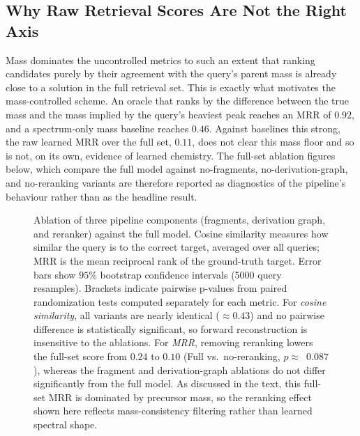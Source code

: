 \subsection{Why Raw Retrieval Scores Are Not the Right Axis}
\label{sec:raw-scores}

Mass dominates the uncontrolled metrics to such an extent that ranking candidates purely by their agreement with the query's parent mass is already close to a solution in the full retrieval set.
This is exactly what motivates the mass-controlled scheme.
An oracle that ranks by the difference between the true mass and the mass implied by the query's heaviest peak reaches an MRR of $0.92$, and a spectrum-only mass baseline reaches $0.46$.
Against baselines this strong, the raw learned MRR over the full set, $0.11$, does not clear this mass floor and so is not, on its own, evidence of learned chemistry.
The full-set ablation figures below, which compare the full model against no-fragments, no-derivation-graph, and no-reranking variants are therefore reported as diagnostics of the pipeline's behaviour rather than as the headline result.

\begin{figure}[H]
    \centering
    \caption[Cosine similarity and MRR for ablation variants]{
        Ablation of three pipeline components (fragments, derivation graph, and reranker) against the full model.
        Cosine similarity measures how similar the query is to the correct target, averaged over all queries; MRR is the mean reciprocal rank of the ground-truth target.
        Error bars show $95 \%$ bootstrap confidence intervals (5000 query resamples).
        Brackets indicate pairwise p-values from paired randomization tests
        computed separately for each metric.
        For \emph{cosine similarity}, all variants are nearly identical ($\approx 0.43$) and no pairwise difference is statistically significant, so forward reconstruction is insensitive to the ablations.
        For \emph{MRR}, removing reranking lowers the full-set score from $0.24$ to $0.10$ (Full vs.\ no-reranking, $p \approx$~$0.087$),
        whereas the fragment and derivation-graph ablations do not differ significantly from the full model.
        As discussed in the text, this full-set MRR is dominated by precursor mass, so the reranking effect shown here reflects mass-consistency filtering rather than learned spectral shape.
        }
    \label{fig:cosine-mrr}
\end{figure}

